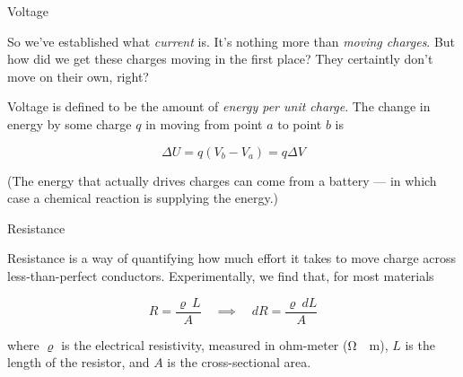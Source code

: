 \documentclass{beamer}
\begin{document}
\begin{frame}{Voltage}

So we've established what \emph{current} is. It's nothing more than \emph{moving charges}. But how did we get these charges moving in the first place? They certaintly don't move on their own, right?

\vfill

Voltage is defined to be the amount of \emph{energy per unit charge}. The change in energy by some charge $q$ in moving from point $a$ to point $b$ is

\begin{equation*}
    \Delta U = q \left( V_b - V_a \right) = q \Delta V
\end{equation*}

\vfill

(The energy that actually drives charges can come from a battery --- in which case a chemical reaction is supplying the energy.)

\end{frame}

\begin{frame}{Resistance}

Resistance is a way of quantifying how much effort it takes to move charge across less-than-perfect conductors. Experimentally, we find that, for most materials

\begin{equation*}
    R = \frac{\varrho\ L}{A} \quad \implies \quad dR = \frac{\varrho\ dL}{A}
\end{equation*}

where $\varrho$ is the electrical resistivity, measured in ohm-meter (\si{\ohm\cdot\metre}), $L$ is the length of the resistor, and $A$ is the cross-sectional area.
    
\end{frame}
\end{document}
